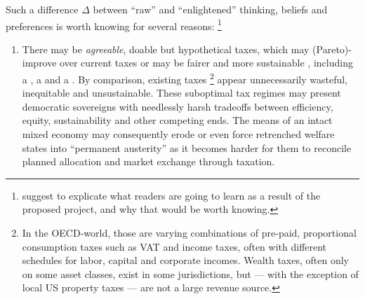 Such a difference $\Delta$ between ``raw'' and ``enlightened'' thinking, %
beliefs \citep{Caplan2007} and preferences \citep{Fishkin2009} is worth knowing for several reasons:
\footnote{
	\cite{PrzeworskiSalomon1995} suggest to explicate what readers are going to learn as a result of the proposed project, and why that would be worth knowing.
}
\begin{enumerate}
	\item 
		There may be \emph{agreeable}, doable but hypothetical taxes, which may (Pareto)-improve over current taxes \citep{Harberger1974} or may be fairer \citep{Rawls-1971-aa} and more sustainable \citep{Solow1956}, including a  \citep{Mill1848,McCaffery2002,Frank2005a,Seidman1997}, a  \citep{George1879,Buiter1988} and a  \citep{Friedman1962}.
		By comparison, existing taxes
		\footnote{
			In the \gls{OECD}-world, those are varying combinations of pre-paid, proportional consumption taxes such as \gls{VAT} and income taxes, often with different schedules for labor, capital and corporate incomes. 
			Wealth taxes, often only on some asset classes, exist in some jurisdictions, but --- with the exception of local US property taxes --- are not a large revenue source.
		}
		appear unnecessarily wasteful, inequitable and unsustainable.
		These suboptimal tax regimes may present democratic sovereigns with needlessly harsh tradeoffs between efficiency, equity, sustainability and other competing ends.
		The means of an intact mixed economy \citep{MusgThet1959,Stiglitz2011} may consequently erode or even force retrenched welfare states into ``permanent austerity'' \citep{Pierson2002,StreeckMertens2010} as it becomes harder for them to reconcile planned allocation and market exchange through taxation.
		

\end{enumerate}
